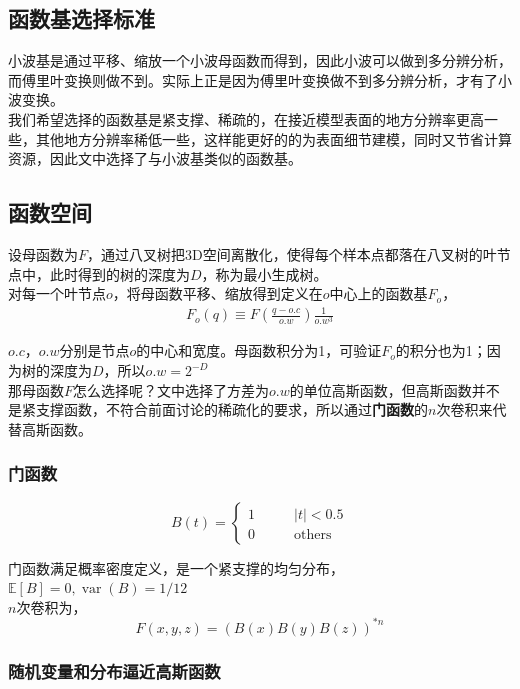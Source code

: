 	\subsection{函数基选择标准}
		小波基是通过平移、缩放一个小波母函数而得到，因此小波可以做到多分辨分析，而傅里叶变换则做不到。实际上正是因为傅里叶变换做不到多分辨分析，才有了小波变换。\\

		我们希望选择的函数基是紧支撑、稀疏的，在接近模型表面的地方分辨率更高一些，其他地方分辨率稀低一些，这样能更好的的为表面细节建模，同时又节省计算资源，因此文中选择了与小波基类似的函数基。

	\subsection{函数空间}
		设母函数为$F$，通过八叉树把3D空间离散化，使得每个样本点都落在八叉树的叶节点中，此时得到的树的深度为$D$，称为最小生成树。\\

		对每一个叶节点$o$，将母函数平移、缩放得到定义在$o$中心上的函数基$F_o$，
		\begin{align}
			F_o(q) \equiv F\left(\frac{q-o.c}{o.w}\right)\frac{1}{o.w^3} \label{wavelet_func}
		\end{align}

		$o.c$，$o.w$分别是节点$o$的中心和宽度。母函数积分为1，可验证$F_o$的积分也为1；因为树的深度为$D$，所以$o.w = 2^{-D}$\\

		那母函数$F$怎么选择呢？文中选择了方差为$o.w$的单位高斯函数，但高斯函数并不是紧支撑函数，不符合前面讨论的稀疏化的要求，所以通过\textbf{门函数}的$n$次卷积来代替高斯函数。

		\subsubsection*{门函数}
			$$
				B(t) = \left\lbrace 
					\begin{aligned}
						1 \qquad &|t| < 0.5 \\
						0 \qquad &\text{others}
					\end{aligned}
				\right.
			$$

			门函数满足概率密度定义，是一个紧支撑的均匀分布，$\mathbb{E}[B] = 0, \mathop{var}(B) = 1/12$\\

			$n$次卷积为，
			$$
				F(x,y,z) = \left(B(x)B(y)B(z)\right)^{*n}
			$$

		\subsubsection*{随机变量和分布逼近高斯函数}

